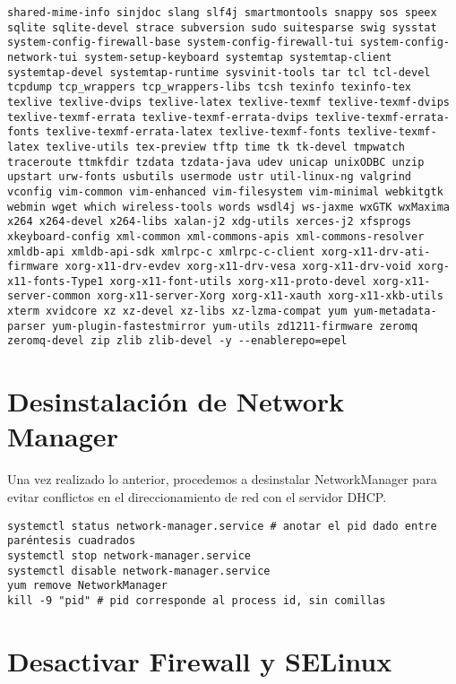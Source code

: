 \begin{lstlisting}
shared-mime-info sinjdoc slang slf4j smartmontools snappy sos speex sqlite sqlite-devel strace subversion sudo suitesparse swig sysstat system-config-firewall-base system-config-firewall-tui system-config-network-tui system-setup-keyboard systemtap systemtap-client systemtap-devel systemtap-runtime sysvinit-tools tar tcl tcl-devel tcpdump tcp_wrappers tcp_wrappers-libs tcsh texinfo texinfo-tex texlive texlive-dvips texlive-latex texlive-texmf texlive-texmf-dvips texlive-texmf-errata texlive-texmf-errata-dvips texlive-texmf-errata-fonts texlive-texmf-errata-latex texlive-texmf-fonts texlive-texmf-latex texlive-utils tex-preview tftp time tk tk-devel tmpwatch traceroute ttmkfdir tzdata tzdata-java udev unicap unixODBC unzip upstart urw-fonts usbutils usermode ustr util-linux-ng valgrind vconfig vim-common vim-enhanced vim-filesystem vim-minimal webkitgtk webmin wget which wireless-tools words wsdl4j ws-jaxme wxGTK wxMaxima x264 x264-devel x264-libs xalan-j2 xdg-utils xerces-j2 xfsprogs xkeyboard-config xml-common xml-commons-apis xml-commons-resolver xmldb-api xmldb-api-sdk xmlrpc-c xmlrpc-c-client xorg-x11-drv-ati-firmware xorg-x11-drv-evdev xorg-x11-drv-vesa xorg-x11-drv-void xorg-x11-fonts-Type1 xorg-x11-font-utils xorg-x11-proto-devel xorg-x11-server-common xorg-x11-server-Xorg xorg-x11-xauth xorg-x11-xkb-utils xterm xvidcore xz xz-devel xz-libs xz-lzma-compat yum yum-metadata-parser yum-plugin-fastestmirror yum-utils zd1211-firmware zeromq zeromq-devel zip zlib zlib-devel -y --enablerepo=epel
\end{lstlisting}

\section{Desinstalación de Network Manager}

Una vez realizado lo anterior, procedemos a desinstalar NetworkManager para evitar conflictos en el direccionamiento de red con el servidor DHCP.

\begin{lstlisting} 
systemctl status network-manager.service # anotar el pid dado entre paréntesis cuadrados
systemctl stop network-manager.service
systemctl disable network-manager.service
yum remove NetworkManager
kill -9 "pid" # pid corresponde al process id, sin comillas
\end{lstlisting}

\section{Desactivar Firewall y SELinux}

